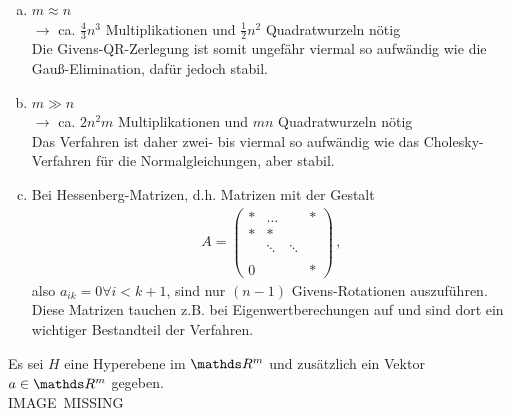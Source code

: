 \begin{enumerate}[a)]
	\item $m\approx n$\\ $\rightarrow $  ca. $\frac{4}{3}n^3$ Multiplikationen
	und $\frac{1}{2}n^2$ Quadratwurzeln nötig \\
	Die Givens-QR-Zerlegung ist somit ungefähr viermal so aufwändig
	wie die Gauß-Elimination, dafür jedoch stabil.
	\item $m\gg n$\\ $\rightarrow $ ca. $2n^2m$ Multiplikationen und 
	$mn$ Quadratwurzeln nötig \\
	Das Verfahren ist daher zwei- bis viermal so aufwändig wie das
	Cholesky-Verfahren für die Normalgleichungen, aber stabil.
	\item Bei Hessenberg-Matrizen, d.h. Matrizen mit der Gestalt
	\begin{gather}
	A= \begin{pmatrix}
	* & \dots&& * \\
	*&* \\
	&\ddots& \ddots \\
	\\
	0 &&& * 
	\end{pmatrix}
	\label{IV.4.7} \, ,
	\end{gather}
	also $a_{ik} = 0 \forall i<k+1$,
	sind nur $(n-1)$ Givens-Rotationen auszuführen. \\
	Diese Matrizen tauchen z.B. bei Eigenwertberechungen auf
	und sind dort ein wichtiger Bestandteil der Verfahren.
\end{enumerate}



Es sei $H$ eine Hyperebene im $\R^m$ und zusätzlich ein Vektor $a\in\R^m$ gegeben. \\

IMAGE~MISSING \\

